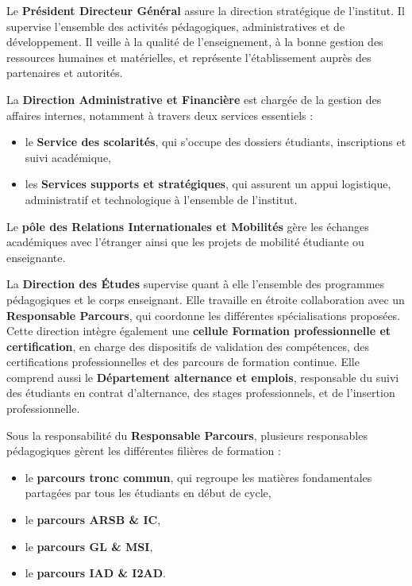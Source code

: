 \documentclass[a4paper,12pt, oneside]{article}
\begin{document}
Le \textbf{Président Directeur Général} assure la direction stratégique de l’institut. Il supervise l’ensemble des activités pédagogiques, administratives et de développement. Il veille à la qualité de l’enseignement, à la bonne gestion des ressources humaines et matérielles, et représente l’établissement auprès des partenaires et autorités.

La \textbf{Direction Administrative et Financière} est chargée de la gestion des affaires internes, notamment à travers deux services essentiels : 
\begin{itemize}
    \item le \textbf{Service des scolarités}, qui s’occupe des dossiers étudiants, inscriptions et suivi académique,
    \item les \textbf{Services supports et stratégiques}, qui assurent un appui logistique, administratif et technologique à l’ensemble de l’institut.
\end{itemize}

Le \textbf{pôle des Relations Internationales et Mobilités} gère les échanges académiques avec l’étranger ainsi que les projets de mobilité étudiante ou enseignante. 

La \textbf{Direction des Études} supervise quant à elle l’ensemble des programmes pédagogiques et le corps enseignant. Elle travaille en étroite collaboration avec un \textbf{Responsable Parcours}, qui coordonne les différentes spécialisations proposées. Cette direction intègre également une \textbf{cellule Formation professionnelle et certification}, en charge des dispositifs de validation des compétences, des certifications professionnelles et des parcours de formation continue. Elle comprend aussi le \textbf{Département alternance et emplois}, responsable du suivi des étudiants en contrat d’alternance, des stages professionnels, et de l’insertion professionnelle.

Sous la responsabilité du \textbf{Responsable Parcours}, plusieurs responsables pédagogiques gèrent les différentes filières de formation :
\begin{itemize}
    \item le \textbf{parcours tronc commun}, qui regroupe les matières fondamentales partagées par tous les étudiants en début de cycle,
    \item le \textbf{parcours ARSB \& IC},
    \item le \textbf{parcours GL \& MSI},
    \item le \textbf{parcours IAD \& I2AD}.
\end{itemize}
\end{document}
